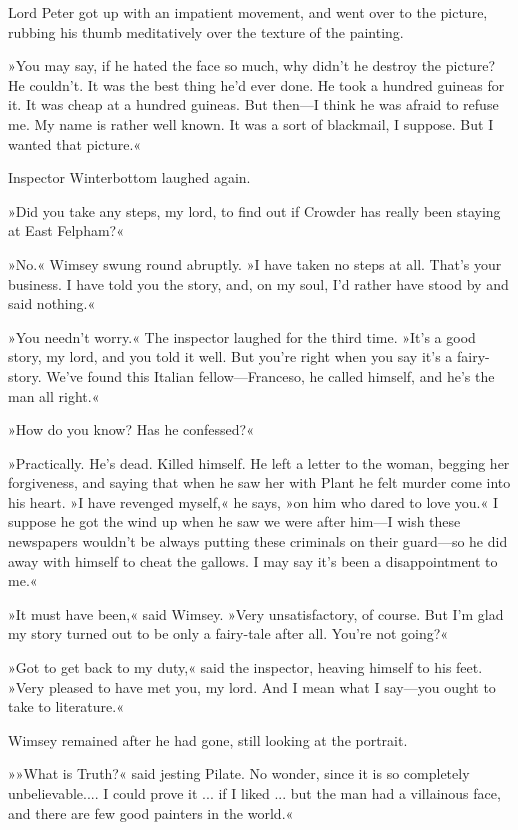 Lord Peter got up with an impatient movement, and went over to the picture, rubbing his thumb meditatively over the texture of the painting.

»You may say, if he hated the face so much, why didn't he destroy the picture? He couldn't. It was the best thing he'd ever done. He took a hundred guineas for it. It was cheap at a hundred guineas. But then—I think he was afraid to refuse me. My name is rather well known. It was a sort of blackmail, I suppose. But I wanted that picture.«

Inspector Winterbottom laughed again.

»Did you take any steps, my lord, to find out if Crowder has really been staying at East Felpham?«

»No.« Wimsey swung round abruptly. »I have taken no steps at all. That's your business. I have told you the story, and, on my soul, I'd rather have stood by and said nothing.«

»You needn't worry.« The inspector laughed for the third time. »It's a good story, my lord, and you told it well. But you're right when you say it's a fairy-story. We've found this Italian fellow—Franceso, he called himself, and he's the man all right.«

»How do you know? Has he confessed?«

»Practically. He's dead. Killed himself. He left a letter to the woman, begging her forgiveness, and saying that when he saw her with Plant he felt murder come into his heart. »I have revenged myself,« he says, »on him who dared to love you.« I suppose he got the wind up when he saw we were after him—I wish these newspapers wouldn't be always putting these criminals on their guard—so he did away with himself to cheat the gallows. I may say it's been a disappointment to me.«

»It must have been,« said Wimsey. »Very unsatisfactory, of course. But I'm glad my story turned out to be only a fairy-tale after all. You're not going?«

»Got to get back to my duty,« said the inspector, heaving himself to his feet. »Very pleased to have met you, my lord. And I mean what I say—you ought to take to literature.«

Wimsey remained after he had gone, still looking at the portrait.

»»What is Truth?« said jesting Pilate. No wonder, since it is so completely unbelievable.... I could prove it ... if I liked ... but the man had a villainous face, and there are few good painters in the world.«